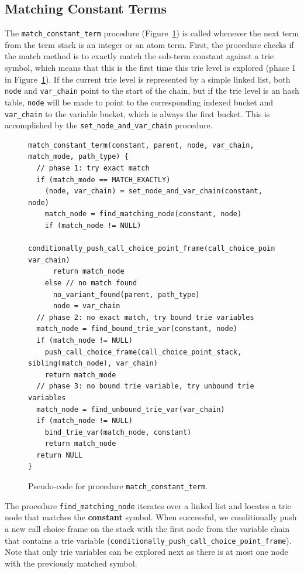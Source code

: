 \subsection{Matching Constant Terms}

The \texttt{match\_constant\_term} procedure (Figure~\ref{fig:match_constant}) is called whenever the
next term from the term stack is an integer or an atom term.
First, the procedure checks if the match method is to exactly match the
sub-term constant against a trie symbol, which means
that this is the first time this trie level is explored (phase 1 in Figure~\ref{fig:match_constant}).
If the current trie level is represented by a simple linked list, both \texttt{node} and \texttt{var\_chain}
point to the start of the chain, but if the trie level is an hash table,
\texttt{node} will be made to point to the corresponding indexed bucket and \texttt{var\_chain}
to the variable bucket, which is always the first bucket. This is accomplished by the \texttt{set\_node\_and\_var\_chain}
procedure.

\begin{figure}[ht]
\begin{Verbatim}
match_constant_term(constant, parent, node, var_chain, match_mode, path_type) {
  // phase 1: try exact match
  if (match_mode == MATCH_EXACTLY)
    (node, var_chain) = set_node_and_var_chain(constant, node)
    match_node = find_matching_node(constant, node)
    if (match_node != NULL)
      conditionally_push_call_choice_point_frame(call_choice_point_stack, var_chain)
      return match_node
    else // no match found  
      no_variant_found(parent, path_type)
      node = var_chain
  // phase 2: no exact match, try bound trie variables
  match_node = find_bound_trie_var(constant, node)
  if (match_node != NULL)
    push_call_choice_frame(call_choice_point_stack, sibling(match_node), var_chain)
    return match_mode
  // phase 3: no bound trie variable, try unbound trie variables
  match_node = find_unbound_trie_var(var_chain)
  if (match_node != NULL)
    bind_trie_var(match_node, constant)
    return match_node
  return NULL
}
\end{Verbatim}
\caption{Pseudo-code for procedure \texttt{match\_constant\_term}.}
\label{fig:match_constant}
\end{figure}

The procedure \texttt{find\_matching\_node} iterates over a linked list and locates a trie node that matches the
\textbf{constant} symbol. When successful, we conditionally push a new call choice frame on the stack
with the first node from the variable chain that contains a trie variable
(\texttt{conditionally\_push\_call\_choice\_point\_frame}).
Note that only trie variables can be explored next as there is at most one node with the previously
matched symbol.

